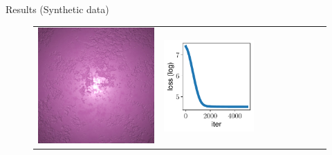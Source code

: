 \documentclass[final]{beamer}
\newlength{\twocolwid}
\newlength{\resultwidth}
\begin{document}
\begin{frame}[t]
\begin{columns}[t]
\begin{column}{\twocolwid}
\begin{block}{Results (Synthetic data)}
\begin{figure}[t]
\begin{tabular}{ccrclcccc}
            		\includegraphics[width=\resultwidth]{images/synth/plaster/target.jpg} &
            		\includegraphics[width=\resultwidth]{images/synth/plaster/loss.pdf} &

\end{tabular}
\end{figure}
\end{block}
\end{column}
\end{columns}
\end{frame}
\end{document}
